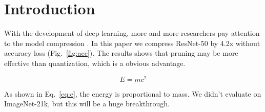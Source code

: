 \documentclass{article}
\begin{document}
\section{Introduction}
With the development of deep learning, more and more researchers pay attention to the model compression \cite{han2016,hinton2015}.  In this paper we compress ResNet-50 by 4.2x without accuracy loss (Fig.~\ref{fig:acc}). The results shows that pruning may be more effective than quantization, which is a obvious advantage.

\begin{equation}
E = mc^2 \label{eq:e}
\end{equation}

As shown in Eq.~\eqref{eq:e}, the energy is proportional to mass. We didn't evaluate on ImageNet-21k, but this will be a huge breakthrough.
\end{document}
